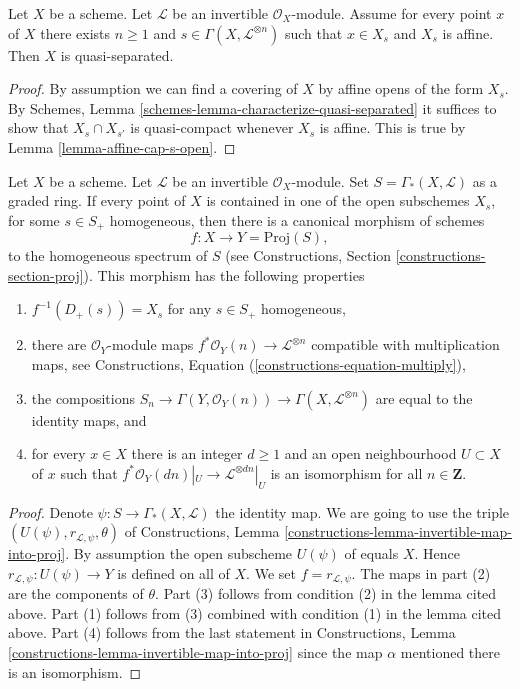 \begin{lemma}
\label{lemma-affine-s-opens-cover-quasi-separated}
Let $X$ be a scheme. Let $\mathcal{L}$ be an invertible $\mathcal{O}_X$-module.
Assume for every point $x$ of $X$ there exists $n \geq 1$ and
$s \in \Gamma(X, \mathcal{L}^{\otimes n})$ such that
$x \in X_s$ and $X_s$ is affine. Then $X$ is quasi-separated.
\end{lemma}

\begin{proof}
By assumption we can find a covering of $X$ by affine opens of the form $X_s$.
By Schemes, Lemma \ref{schemes-lemma-characterize-quasi-separated}
it suffices to show that $X_s \cap X_{s'}$ is quasi-compact
whenever $X_s$ is affine. This is true by Lemma \ref{lemma-affine-cap-s-open}.
\end{proof}

\begin{lemma}
\label{lemma-map-into-proj}
Let $X$ be a scheme.
Let $\mathcal{L}$ be an invertible $\mathcal{O}_X$-module.
Set $S = \Gamma_*(X, \mathcal{L})$ as a graded ring.
If every point of $X$ is contained in one of the
open subschemes $X_s$, for some $s \in S_{+}$ homogeneous, then
there is a canonical morphism of schemes
$$
f : X \longrightarrow Y = \text{Proj}(S),
$$
to the homogeneous spectrum of $S$ (see
Constructions, Section \ref{constructions-section-proj}).
This morphism has the following properties
\begin{enumerate}
\item $f^{-1}(D_{+}(s)) = X_s$ for any $s \in S_{+}$ homogeneous,
\item there are $\mathcal{O}_Y$-module maps
$f^*\mathcal{O}_Y(n) \to \mathcal{L}^{\otimes n}$
compatible with multiplication maps, see
Constructions, Equation (\ref{constructions-equation-multiply}),
\item the compositions
$S_n \to
\Gamma(Y, \mathcal{O}_Y(n)) \to
\Gamma(X, \mathcal{L}^{\otimes n})$
are equal to the identity maps, and
\item for every $x \in X$ there is an integer $d \geq 1$
and an open neighbourhood $U \subset X$ of $x$
such that $f^*\mathcal{O}_Y(dn)|_U \to \mathcal{L}^{\otimes dn}|_U$
is an isomorphism for all $n \in \mathbf{Z}$.
\end{enumerate}
\end{lemma}

\begin{proof}
Denote $\psi : S \to \Gamma_*(X, \mathcal{L})$ the identity map.
We are going to use the triple
$(U(\psi), r_{\mathcal{L}, \psi}, \theta)$ of
Constructions, Lemma \ref{constructions-lemma-invertible-map-into-proj}.
By assumption the open subscheme $U(\psi)$ of equals $X$. Hence
$r_{\mathcal{L}, \psi} : U(\psi) \to Y$ is defined on all of $X$.
We set $f = r_{\mathcal{L}, \psi}$.
The maps in part (2) are the components of $\theta$.
Part (3) follows from condition (2) in the lemma cited above.
Part (1) follows from (3) combined with condition (1) in the lemma
cited above. Part (4) follows from the last statement in
Constructions, Lemma \ref{constructions-lemma-invertible-map-into-proj}
since the map $\alpha$ mentioned there is an isomorphism.
\end{proof}

